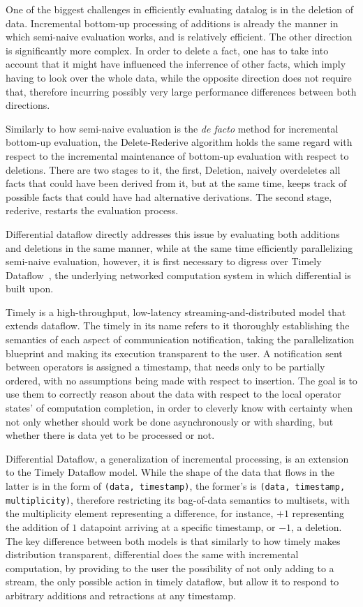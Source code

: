 \documentclass[manuscript,screen,review]{acmart}
\theoremstyle{definition}
\begin{document}
One of the biggest challenges in efficiently evaluating datalog is in the deletion of data. Incremental bottom-up processing of additions is already the
manner in which semi-naive evaluation works, and is relatively efficient. The other direction is significantly more complex. In order to delete a fact,
one has to take into account that it might have influenced the inferrence of other facts, which imply having to look over the whole data, while the opposite
direction does not require that, therefore incurring possibly very large performance differences between both directions.

Similarly to how semi-naive evaluation is the \textit{de facto} method for incremental bottom-up evaluation, the Delete-Rederive\cite{dred} algorithm holds
the same regard with respect to the incremental maintenance of bottom-up evaluation with respect to deletions. There are two stages to it, the first, Deletion,
naively overdeletes all facts that could have been derived from it, but at the same time, keeps track of possible facts that could have had alternative
derivations. The second stage, rederive, restarts the evaluation process.

Differential dataflow directly addresses this issue by evaluating both additions and deletions in the same manner, while at the same time efficiently parallelizing
semi-naive evaluation, however, it is first necessary to digress over Timely Dataflow~\cite{timely}, the underlying networked computation system in which differential
is built upon.

Timely is a high-throughput, low-latency streaming-and-distributed model that extends dataflow. The timely in its name refers to it thoroughly establishing
the semantics of each aspect of communication notification, taking the parallelization blueprint and making its execution transparent to the user. A notification
sent between operators is assigned a timestamp, that needs only to be partially ordered, with no assumptions being made with respect to insertion. The goal is to use
them to correctly reason about the data with respect to the local operator states' of computation completion, in order to cleverly know with certainty when not only
whether should work be done asynchronously or with sharding, but whether there is data yet to be processed or not.

Differential Dataflow, a generalization of incremental processing, is an extension to the Timely Dataflow model. While the shape of the data that flows in the latter is
in the form of \verb|(data, timestamp)|, the former's is \verb|(data, timestamp, multiplicity)|, therefore restricting its bag-of-data semantics to multisets, with
the multiplicity element representing a difference, for instance, $+1$ representing the addition of $1$ datapoint arriving at a specific timestamp, or $-1$, a deletion. The
key difference between both models is that similarly to how timely makes distribution transparent, differential does the same with incremental computation, by providing to the
user the possibility of not only adding to a stream, the only possible action in timely dataflow, but allow it to respond to arbitrary additions and retractions at any timestamp.
\end{document}
